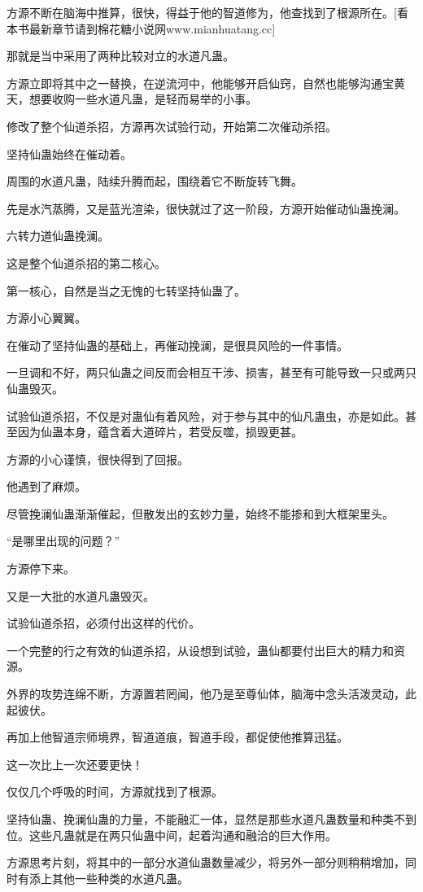 \begin{this_body}
方源不断在脑海中推算，很快，得益于他的智道修为，他查找到了根源所在。[看本书最新章节请到棉花糖小说网www.mianhuatang.cc]

那就是当中采用了两种比较对立的水道凡蛊。

方源立即将其中之一替换，在逆流河中，他能够开启仙窍，自然也能够沟通宝黄天，想要收购一些水道凡蛊，是轻而易举的小事。

修改了整个仙道杀招，方源再次试验行动，开始第二次催动杀招。

坚持仙蛊始终在催动着。

周围的水道凡蛊，陆续升腾而起，围绕着它不断旋转飞舞。

先是水汽蒸腾，又是蓝光渲染，很快就过了这一阶段，方源开始催动仙蛊挽澜。

六转力道仙蛊挽澜。

这是整个仙道杀招的第二核心。

第一核心，自然是当之无愧的七转坚持仙蛊了。

方源小心翼翼。

在催动了坚持仙蛊的基础上，再催动挽澜，是很具风险的一件事情。

一旦调和不好，两只仙蛊之间反而会相互干涉、损害，甚至有可能导致一只或两只仙蛊毁灭。

试验仙道杀招，不仅是对蛊仙有着风险，对于参与其中的仙凡蛊虫，亦是如此。甚至因为仙蛊本身，蕴含着大道碎片，若受反噬，损毁更甚。

方源的小心谨慎，很快得到了回报。

他遇到了麻烦。

尽管挽澜仙蛊渐渐催起，但散发出的玄妙力量，始终不能掺和到大框架里头。

“是哪里出现的问题？”

方源停下来。

又是一大批的水道凡蛊毁灭。

试验仙道杀招，必须付出这样的代价。

一个完整的行之有效的仙道杀招，从设想到试验，蛊仙都要付出巨大的精力和资源。

外界的攻势连绵不断，方源置若罔闻，他乃是至尊仙体，脑海中念头活泼灵动，此起彼伏。

再加上他智道宗师境界，智道道痕，智道手段，都促使他推算迅猛。

这一次比上一次还要更快！

仅仅几个呼吸的时间，方源就找到了根源。

坚持仙蛊、挽澜仙蛊的力量，不能融汇一体，显然是那些水道凡蛊数量和种类不到位。这些凡蛊就是在两只仙蛊中间，起着沟通和融洽的巨大作用。

方源思考片刻，将其中的一部分水道仙蛊数量减少，将另外一部分则稍稍增加，同时有添上其他一些种类的水道凡蛊。


\end{this_body}
